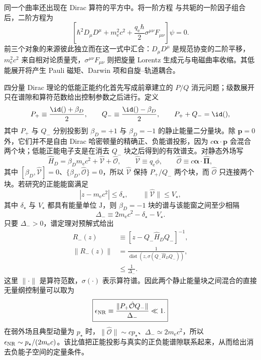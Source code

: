同一个曲率还出现在 Dirac 算符的平方中。将一阶方程  与共轭的一阶因子组合后，二阶方程为
\begin{equation}
 \boxed{
 \left[
 \hbar^2D_\mu D^\mu+m_{\mathrm e}^2c^2
 +\frac{q_{\mathrm e}\hbar}{2}\sigma^{\mu\nu}F_{\mu\nu}
 \right]\psi=0.
 }
 \label{eq:dirac-squared}
\end{equation}
前三个对象的来源彼此独立而在这一式中汇合：$D_\mu D^\mu$ 是规范协变的二阶平移，$m_{\mathrm e}^2c^2$ 来自相对论质量壳，$\sigma^{\mu\nu}F_{\mu\nu}$ 则把旋量 Lorentz 生成元与电磁曲率收缩。其低能展开将产生 Pauli 磁矩、Darwin 项和自旋--轨道耦合。

四分量 Dirac 理论的低能正能约化首先写成前章建立的 $P/Q$ 消元问题；级数展开只在谱隙和算符范数给出控制参数之后进行。定义
\begin{equation}
 P_+\equiv\frac{\id()+\beta_D}{2},
 \qquad
 Q_-\equiv\frac{\id()-\beta_D}{2},
 \qquad
 P_++Q_-=\id(),
 \label{eq:dirac-positive-negative-projectors-r16}
\end{equation}
其中 $P_+$ 与 $Q_-$ 分别投影到 $\beta_D=+1$ 与 $\beta_D=-1$ 的静止能量二分量块。除 $\mathbf p=0$ 外，它们并不是自由 Dirac 哈密顿量的精确正、负能谱投影，因为 $c\boldsymbol\alpha\cdot\mathbf p$ 会混合两个块；低能正能电子支是在消去 $Q_-$ 块之后得到的有效谱支。对静态外场写
\begin{equation}
 \hat H_D=\beta_Dm_{\mathrm e} c^2+\hat{\mathcal V}+\hat{\mathcal O},
 \qquad
 \hat{\mathcal V}\equiv q_{\mathrm e}\phi,
 \qquad
 \hat{\mathcal O}\equiv c\boldsymbol\alpha\cdot\hat{\boldsymbol\Pi},
 \label{eq:dirac-even-odd-decomposition-r16}
\end{equation}
其中 $[\beta_D,\hat{\mathcal V}]=0$、$\{\beta_D,\hat{\mathcal O}\}=0$，所以 $\hat{\mathcal V}$ 保持 $P_+/Q_-$ 两个块，而 $\hat{\mathcal O}$ 只连接两个块。若研究的正能能窗满足
\begin{equation*}
 |z-m_{\mathrm e} c^2|\le\delta_\star,
 \qquad
 \|\hat{\mathcal V}\|\le V_\star,
\end{equation*}
其中 $\delta_\star$ 与 $V_\star$ 都具有能量单位 $\mathrm J$，则 $\beta_D=-1$ 块的谱与该能窗之间至少相隔
\begin{equation*}
 \Delta_-
 \equiv2m_{\mathrm e} c^2-\delta_\star-V_\star.
\end{equation*}
只要 $\Delta_->0$，谱定理对预解式给出
\begin{align}
 R_-(z)
 &\equiv\left[z-Q_-\hat H_DQ_-\right]^{-1},\\
 \|R_-(z)\|
 &=\frac{1}{\operatorname{dist}\!\left(z,\sigma(Q_-\hat H_DQ_-)\right)},\\
 &\le\frac1{\Delta_-}.
 \label{eq:dirac-negative-resolvent-bound-r16}
\end{align}
这里 $\|\cdot\|$ 是算符范数，$\sigma(\cdot)$ 表示算符谱。因此两个静止能量块之间混合的直接无量纲控制量可以取为
\begin{equation}
 \boxed{
 \epsilon_{\rm NR}
 \equiv
 \frac{\|P_+\hat{\mathcal O}Q_-\|}{\Delta_-}\ll1.}
 \label{eq:dirac-pauli-control-r16}
\end{equation}
在弱外场且典型动量为 $p_\star$ 时，$\|\hat{\mathcal O}\|\sim cp_\star$、$\Delta_-\simeq2m_{\mathrm e} c^2$，所以 $\epsilon_{\rm NR}\sim p_\star/(2m_{\mathrm e} c)$。该比值把正能投影与真实的正负能谱隙联系起来，从而给出消去负能子空间的定量条件。

